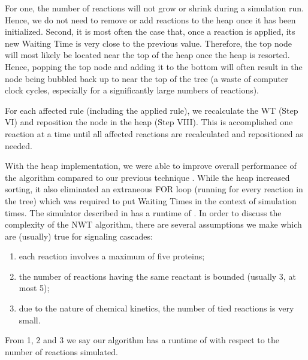 \documentclass[copyright]{eptcs}
\begin{document}
For one, the number of reactions will not grow or shrink during a simulation run.  Hence, we do not need to remove or add reactions to the heap once it has been initialized.  Second, it is most often the case that, once a reaction is applied, its new Waiting Time is very close to the previous value.  Therefore, the top node will most likely be located near the top of the heap once the heap is resorted.  Hence, popping the top node and adding it to the bottom will often result in the node being bubbled back up to near the top of the tree (a waste of computer clock cycles, especially for a significantly large numbers of reactions).





For each affected rule (including the applied rule), we recalculate the WT (Step VI) and reposition the node in the heap (Step VIII).  This is accomplished one reaction at a time until all affected reactions are recalculated and repositioned as needed.









































With the heap implementation, we were able to improve overall performance of the algorithm compared to our previous technique \cite{cheruku07}.   While the heap increased sorting, it also eliminated an extraneous FOR loop (running for every reaction in the tree) which was required to put Waiting Times in the context of simulation times.  The simulator described in \cite{cheruku07} has a runtime of .  In order to discuss the complexity of the NWT algorithm, there are several assumptions we make which are (usually) true for signaling cascades:

\begin{enumerate}
\item each reaction involves a maximum of five proteins;
\item the number of reactions having the same reactant is bounded (usually 3, at most 5);
\item due to the nature of chemical kinetics, the number of tied reactions is very small.
\end{enumerate}
From 1, 2 and 3 we say our algorithm has a runtime of  with respect to the number of reactions simulated.
\end{document}
